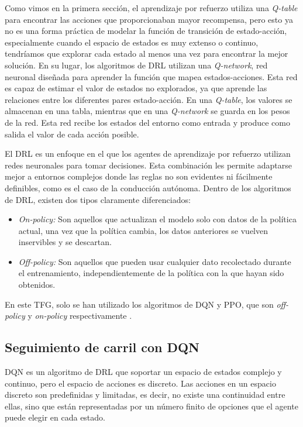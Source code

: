 Como vimos en la primera sección, el aprendizaje por refuerzo utiliza una \textit{Q-table} para encontrar las acciones que proporcionaban mayor recompensa, pero esto ya no es una forma práctica de modelar la función de transición de estado-acción, especialmente cuando el espacio de estados es muy extenso o continuo, tendríamos que explorar cada estado al menos una vez para encontrar la mejor solución. En su lugar, los algoritmos de \ac{DRL} utilizan una \textit{Q-network}, red neuronal diseñada para aprender la función que mapea estados-acciones. Esta red es capaz de estimar el valor de estados no explorados, ya que aprende las relaciones entre los diferentes pares estado-acción. En una \textit{Q-table}, los valores se almacenan en una tabla, mientras que en una \textit{Q-network} se guarda en los pesos de la red. Esta red recibe los estados del entorno como entrada y produce como salida el valor de cada acción posible. 

El \ac{DRL} es un enfoque en el que los agentes de aprendizaje por refuerzo utilizan redes neuronales para tomar decisiones. Esta combinación les permite adaptarse mejor a entornos complejos donde las reglas no son evidentes ni fácilmente definibles, como es el caso de la conducción autónoma. Dentro de los algoritmos de \ac{DRL}, existen dos tipos claramente diferenciados:

\begin{itemize}
		\item \textit{On-policy:} Son aquellos que actualizan el modelo solo con datos de la política actual, una vez que la política cambia, los datos anteriores se vuelven inservibles y se descartan.
		\item \textit{Off-policy:} Son aquellos que pueden usar cualquier dato recolectado durante el entrenamiento, independientemente de la política con la que hayan sido obtenidos.

\end{itemize}

En este \ac{TFG}, solo se han utilizado los algoritmos de \ac{DQN} y \ac{PPO}, que son \textit{off-policy} y \textit{on-policy} respectivamente \cite{drl}.

\subsection{Seguimiento de carril con DQN}

\ac{DQN} es un algoritmo de \ac{DRL} que soportar un espacio de estados complejo y continuo, pero el espacio de acciones es discreto. Las acciones en un espacio discreto son predefinidas y limitadas, es decir, no existe una continuidad entre ellas, sino que están representadas por un número finito de opciones que el agente puede elegir en cada estado.

